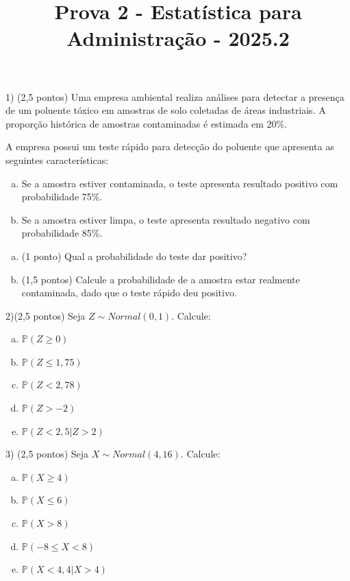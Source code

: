 \documentclass[12pt]{article}
\title{Prova 2 - Estatística para Administração - 2025.2}
\date{}
\makeatletter
\renewcommand{\maketitle}{
  \begin{center}
    {\small\bfseries \@title \par}
  \end{center}
  \vspace{-0.1cm} %
}
\makeatother
\begin{document}
\maketitle


1) (2,5 pontos) Uma empresa ambiental realiza análises para detectar a presença de um poluente tóxico em amostras de solo coletadas de áreas industriais. 
A proporção histórica de amostras contaminadas é estimada em 20\%.

A empresa possui um teste rápido para detecção do poluente que apresenta as seguintes características:

\begin{enumerate}[a)]
    \item Se a amostra estiver contaminada, o teste apresenta resultado positivo com probabilidade 75\%.
    \item Se a amostra estiver limpa, o teste apresenta resultado negativo com probabilidade 85\%.
\end{enumerate}

\begin{enumerate}[a)]
    \item (1 ponto) Qual a probabilidade do teste dar positivo?
    \item (1,5 pontos) Calcule a probabilidade de a amostra estar realmente contaminada, dado que o teste rápido deu positivo.
\end{enumerate}


2)(2,5 pontos) Seja $Z \sim Normal(0,1)$. Calcule:

\begin{enumerate}[a)]
    \item $\mathds{P}(Z \geq 0)$
    \item $\mathds{P}(Z \leq 1,75)$
    \item $\mathds{P}(Z < 2,78)$
    \item $\mathds{P}(Z > -2)$
    \item $\mathds{P}(Z < 2,5|Z>2)$
\end{enumerate}

3) (2,5 pontos) Seja $X \sim Normal(4,16)$. Calcule:

\begin{enumerate}[a)]
    \item $\mathds{P}(X \geq 4)$
    \item $\mathds{P}(X \leq 6)$
    \item $\mathds{P}(X >8 )$
    \item $\mathds{P}(-8 \leq X <8 )$
    \item $\mathds{P}(X < 4,4|X>4)$
\end{enumerate}
\end{document}
